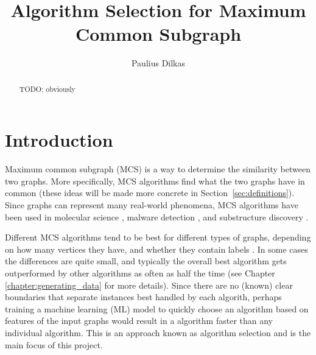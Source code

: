 \documentclass{l4proj}
\title{Algorithm Selection for Maximum Common Subgraph}
\author{Paulius Dilkas}
\theoremstyle{definition}
\theoremstyle{remark}
\begin{document}
\maketitle

\begin{abstract}
  TODO: obviously
\end{abstract}

\educationalconsent
\tableofcontents

\chapter{Introduction}

Maximum common subgraph (MCS) is a way to determine the similarity between two
graphs. More specifically, MCS algorithms find what the two graphs have in
common (these ideas will be made more concrete in
Section~\ref{sec:definitions}). Since graphs can represent many real-world
phenomena, MCS algorithms have been used in molecular science \cite{WCMS:WCMS5,
  DBLP:journals/dam/GayFMSS14, grindley, DBLP:journals/jcamd/RaymondW02a},
malware detection \cite{DBLP:journals/compsec/ParkRS13}, and substructure
discovery \cite{DBLP:journals/jair/CookH94, 617051}.

Different MCS algorithms tend to be best for different types of graphs,
depending on how many vertices they have, and whether they contain labels
\cite{DBLP:conf/ijcai/McCreeshPT17}. In some cases the differences are quite
small, and typically the overall best algorithm gets outperformed by other
algorithms as often as half the time (see Chapter \ref{chapter:generating_data}
for more details). Since there are no (known) clear boundaries that separate
instances best handled by each algorith, perhaps training a machine learning
(ML) model to quickly choose an algorithm based on features of the input graphs
would result in a algorithm faster than any individual algorithm. This is an
approach known as algorithm selection \cite{DBLP:journals/ac/Rice76} and is the
main focus of this project.
\end{document}
